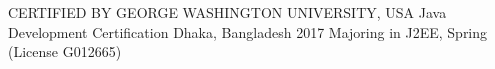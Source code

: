 
\begin{cventries}

  \cventry
    {CERTIFIED BY GEORGE WASHINGTON UNIVERSITY, USA} %
    {Java Development Certification} %
    {Dhaka, Bangladesh} %
    {2017} %
    {Majoring in J2EE, Spring (License G012665)}
\end{cventries}